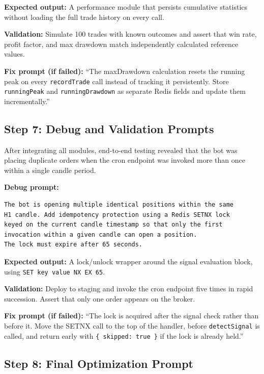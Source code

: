 \documentclass[conference]{IEEEtran}
\begin{document}
\textbf{Expected output:} A performance module that persists
cumulative statistics without loading the full trade history on
every call.

\textbf{Validation:} Simulate 100 trades with known outcomes and
assert that win rate, profit factor, and max drawdown match
independently calculated reference values.

\textbf{Fix prompt (if failed):} ``The maxDrawdown calculation
resets the running peak on every \texttt{recordTrade} call instead
of tracking it persistently.  Store \texttt{runningPeak} and
\texttt{runningDrawdown} as separate Redis fields and update them
incrementally.''

\subsection{Step 7: Debug and Validation Prompts}

After integrating all modules, end-to-end testing revealed that the
bot was placing duplicate orders when the cron endpoint was invoked
more than once within a single candle period.

\textbf{Debug prompt:}
\begin{lstlisting}
The bot is opening multiple identical positions within the same
H1 candle. Add idempotency protection using a Redis SETNX lock
keyed on the current candle timestamp so that only the first
invocation within a given candle can open a position.
The lock must expire after 65 seconds.
\end{lstlisting}

\textbf{Expected output:} A lock/unlock wrapper around the signal
evaluation block, using \texttt{SET key value NX EX 65}.

\textbf{Validation:} Deploy to staging and invoke the cron endpoint
five times in rapid succession.  Assert that only one order appears
on the broker.

\textbf{Fix prompt (if failed):} ``The lock is acquired after the
signal check rather than before it.  Move the SETNX call to the top
of the handler, before \texttt{detectSignal} is called, and return
early with \texttt{\{ skipped: true \}} if the lock is already held.''

\subsection{Step 8: Final Optimization Prompt}
\end{document}
